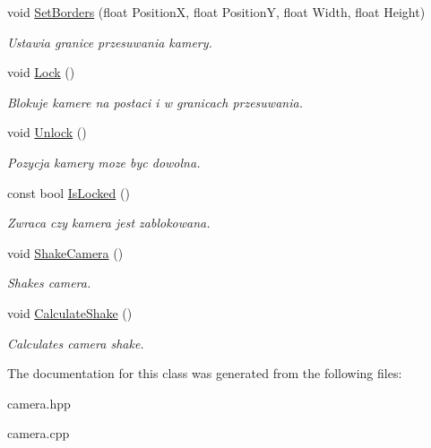 \begin{DoxyCompactItemize}
void \mbox{\hyperlink{classtfp_1_1_camera_aae1ded237ac36f87d0a7683a43c1f35b}{Set\+Borders}} (float PositionX, float PositionY, float Width, float Height)
\begin{DoxyCompactList}\small\item\em Ustawia granice przesuwania kamery. \end{DoxyCompactList}\item 
\mbox{\label{classtfp_1_1_camera_af97e9e2a41c5a7959e06c7e5b18c506e}} 
void \mbox{\hyperlink{classtfp_1_1_camera_af97e9e2a41c5a7959e06c7e5b18c506e}{Lock}} ()
\begin{DoxyCompactList}\small\item\em Blokuje kamere na postaci i w granicach przesuwania. \end{DoxyCompactList}\item 
\mbox{\label{classtfp_1_1_camera_ae4c7557444ff495751d96cd267d2d647}} 
void \mbox{\hyperlink{classtfp_1_1_camera_ae4c7557444ff495751d96cd267d2d647}{Unlock}} ()
\begin{DoxyCompactList}\small\item\em Pozycja kamery moze byc dowolna. \end{DoxyCompactList}\item 
\mbox{\label{classtfp_1_1_camera_aa4c30ce798359c845f8355367a5eb799}} 
const bool \mbox{\hyperlink{classtfp_1_1_camera_aa4c30ce798359c845f8355367a5eb799}{Is\+Locked}} ()
\begin{DoxyCompactList}\small\item\em Zwraca czy kamera jest zablokowana. \end{DoxyCompactList}\item 
\mbox{\label{classtfp_1_1_camera_a2250ca9f3e536c9b14986a7b04d19324}} 
void \mbox{\hyperlink{classtfp_1_1_camera_a2250ca9f3e536c9b14986a7b04d19324}{Shake\+Camera}} ()
\begin{DoxyCompactList}\small\item\em Shakes camera. \end{DoxyCompactList}\item 
\mbox{\label{classtfp_1_1_camera_ad2b6fd1f47f96755e5cb5053cf295808}} 
void \mbox{\hyperlink{classtfp_1_1_camera_ad2b6fd1f47f96755e5cb5053cf295808}{Calculate\+Shake}} ()
\begin{DoxyCompactList}\small\item\em Calculates camera shake. \end{DoxyCompactList}\end{DoxyCompactItemize}


The documentation for this class was generated from the following files\+:\begin{DoxyCompactItemize}
\item 
camera.\+hpp\item 
camera.\+cpp\end{DoxyCompactItemize}
